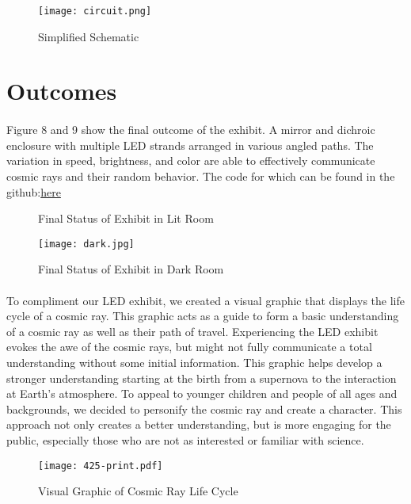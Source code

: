 \documentclass{article}
\begin{document}
\begin{figure}
    \centering
    \texttt{[image: circuit.png]}
    \caption{Simplified Schematic}
\end{figure}

\section{Outcomes}
\paragraph{}Figure 8 and 9 show the final outcome of the exhibit. A mirror and dichroic enclosure with multiple LED strands arranged in various angled paths. The variation in speed, brightness, and color are able to effectively communicate cosmic rays and their random behavior. The code for which can be found in the github:\href{https://github.com/EverettHagen/PHYS494}{here}

\begin{figure}
    \centering
    \caption{Final Status of Exhibit in Lit Room}
\end{figure}
\begin{figure}
    \centering
    \texttt{[image: dark.jpg]}
    \caption{Final Status of Exhibit in Dark Room}
\end{figure}

\paragraph{}To compliment our LED exhibit, we created a visual graphic that displays the life cycle of a cosmic ray. This graphic acts as a guide to form a basic understanding of a cosmic ray as well as their path of travel. Experiencing the LED exhibit evokes the awe of the cosmic rays, but might not fully communicate a total understanding without some initial information. This graphic helps develop a stronger understanding starting at the birth from a supernova to the interaction at Earth’s atmosphere. To appeal to younger children and people of all ages and backgrounds, we decided to personify the cosmic ray and create a character. This approach not only creates a better understanding, but is more engaging for the public, especially those who are not as interested or familiar with science.
\begin{figure}
    \centering
    \texttt{[image: 425-print.pdf]}
    \caption{Visual Graphic of Cosmic Ray Life Cycle}
\end{figure}
\end{document}

